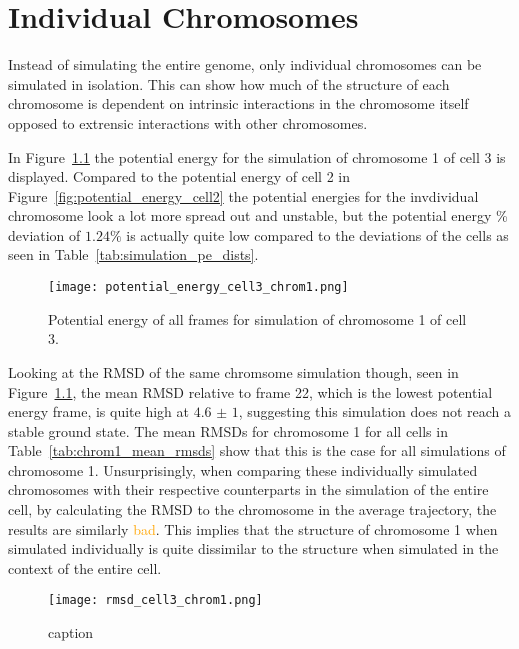
\chapter{Individual Chromosomes} %
\label{cha:individual_chromosomes}

Instead of simulating the entire genome, only individual chromosomes can be simulated in isolation. This can show how much of the structure of each chromosome is dependent on intrinsic interactions in the chromosome itself opposed to extrensic interactions with other chromosomes.

In Figure~\ref{fig:potential_energy_cell3_chrom1} the potential energy for the simulation of chromosome 1 of cell 3 is displayed. Compared to the potential energy of cell 2 in Figure~\ref{fig:potential_energy_cell2} the potential energies for the invdividual chromosome look a lot more spread out and unstable, but the potential energy \% deviation of \(1.24 \%\) is actually quite low compared to the deviations of the cells as seen in Table~\ref{tab:simulation_pe_dists}. 

\begin{figure}[ht]
\centering
	\texttt{[image: potential\_energy\_cell3\_chrom1.png]}
	\caption{Potential energy of all frames for simulation of chromosome 1 of cell 3.}
	\label{fig:potential_energy_cell3_chrom1}
\end{figure}

Looking at the RMSD of the same chromsome simulation though, seen in Figure~\ref{fig:potential_energy_cell3_chrom1}, the mean RMSD relative to frame 22, which is the lowest potential energy frame, is quite high at \(\num{4.6(10)}\), suggesting this simulation does not reach a stable ground state. The mean RMSDs for chromosome 1 for all cells in Table~\ref{tab:chrom1_mean_rmsds} show that this is the case for all simulations of chromosome 1. Unsurprisingly, when comparing these individually simulated chromosomes with their respective counterparts in the simulation of the entire cell, by calculating the RMSD to the chromosome in the average trajectory, the results are similarly \textcolor{orange}{bad}. This implies that the structure of chromosome 1 when simulated individually is quite dissimilar to the structure when simulated in the context of the entire cell.

\begin{figure}[ht]
\centering
	\texttt{[image: rmsd\_cell3\_chrom1.png]}
	\caption{caption}
	\label{fig:rmsd_cell3_chrom1}
\end{figure}

